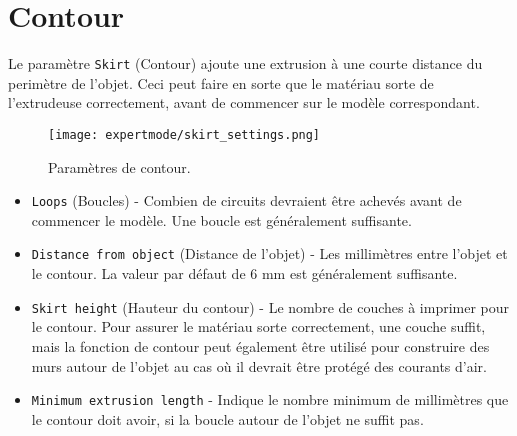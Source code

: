 
\section{Contour} %
\label{sec:skirt}

Le param\`etre \texttt{Skirt} (Contour) ajoute une extrusion \`a une courte distance du perim\`etre de l'objet. Ceci peut faire en sorte que le mat\'eriau sorte de l'extrudeuse correctement, avant de commencer sur le mod\`ele correspondant.

\begin{figure}[H]
\centering
\texttt{[image: expertmode/skirt\_settings.png]}
\caption{Param\`etres de contour.}
\label{fig:skirt_settings}
\end{figure}

\begin{itemize}
    \item \texttt{Loops} (Boucles) - Combien de circuits devraient \^etre achev\'es avant de commencer le mod\`ele. Une boucle est g\'en\'eralement suffisante.
    \item \texttt{Distance from object} (Distance de l'objet) - Les millim\`etres entre l'objet et le contour. La valeur par d\'efaut de 6 mm est g\'en\'eralement suffisante.
    \item \texttt{Skirt height} (Hauteur du contour) - Le nombre de couches \`a imprimer pour le contour. Pour assurer le mat\'eriau sorte correctement, une couche suffit, mais la fonction de contour peut \'egalement \^etre utilis\'e pour construire des murs autour de l'objet au cas o\`u il devrait \^etre prot\'eg\'e des courants d'air.
    \item \texttt{Minimum extrusion length} - Indique le nombre minimum de millim\`etres que le contour doit avoir, si la boucle autour de l'objet ne suffit pas.
\end{itemize}

